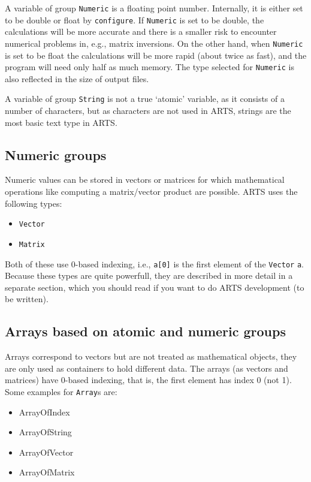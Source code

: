 A variable of group \verb|Numeric| is a floating point number.
Internally, it is either set to be double or float by
\verb|configure|. If \verb|Numeric| is set to be double, the
calculations will be more accurate and there is a smaller risk to
encounter numerical problems in, e.g., matrix inversions.  On the
other hand, when \verb|Numeric| is set to be float the calculations
will be more rapid (about twice as fast), and the program will need
only half as much memory. The type selected for \verb|Numeric| is also
reflected in the size of output files.

A variable of group \verb|String| is not a true `atomic' variable, as
it consists of a number of characters, but as characters are not used
in ARTS, strings are the most basic text type in ARTS.
  

\subsection{Numeric groups}
\label{sec:formats:nummath}
 
Numeric values can be stored in vectors or matrices for which
mathematical operations like computing a matrix/vector product are
possible. ARTS uses the following types:

\begin{itemize}
\item \verb|Vector|
\item \verb|Matrix|
\end{itemize}
Both of these use 0-based indexing, i.e., \verb|a[0]| is the first
element of the \verb|Vector| \verb|a|.  Because these types are quite
powerfull, they are described in more detail in a separate section,
which you should read if you want to do ARTS development (to be written). 

\subsection{Arrays based on atomic and numeric groups}
 \label{sec:formats:atomic_arrays}
 
Arrays correspond to vectors but are not treated as mathematical
objects, they are only used as containers to hold different data.
The arrays (as vectors and matrices) have 0-based indexing, that is,
the first element has index 0 (not 1). Some examples for \verb|Array|s
are:

\begin{itemize}
\item ArrayOfIndex
\item ArrayOfString
\item ArrayOfVector
\item ArrayOfMatrix
\end{itemize}

